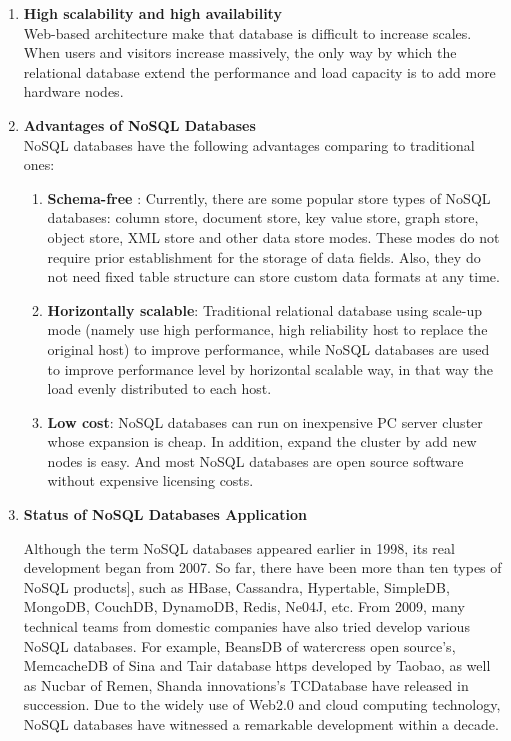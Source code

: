 \documentclass[12pt, a4paper]{article}
\begin{document}
\begin{enumerate}[leftmargin=2.5cm]

\item \textbf{   High scalability and high availability}\\Web-based architecture make that database is difficult to increase scales. When users and visitors increase massively, the only way by which the relational database extend the performance and load capacity is to add more hardware nodes.
\\
\item \textbf{Advantages of NoSQL Databases}\\NoSQL databases have the following advantages comparing to traditional ones:\\
\begin{enumerate}[leftmargin=0.5cm]
\item \textbf{Schema-free} : Currently,  there are some popular store  types  of NoSQL  databases:  column  store,  document  store, key value store,  graph store,  object store,  XML store and other data    store    modes.    These    modes    do    not    require    prior establishment  for  the  storage  of  data  fields.  Also,  they  do  not need fixed table structure can store custom data formats at any time.
\item \textbf{Horizontally scalable}: Traditional relational database using scale-up mode (namely use high performance, high reliability host to replace the original host) to improve performance,  while NoSQL  databases  are  used  to  improve performance level by horizontal scalable way, in that way the load evenly distributed to each host.
\item \textbf{Low cost}: NoSQL databases can run on inexpensive PC server cluster whose expansion is cheap. In addition, expand the cluster by add new nodes is easy. And most NoSQL databases are open source software without expensive licensing costs.\\
\end{enumerate}
\item \textbf{Status of NoSQL Databases Application}
 
Although the term NoSQL databases appeared earlier in 1998, its real development began from 2007. So far, there have been more than ten types of NoSQL products], such as HBase, Cassandra, Hypertable, SimpleDB, MongoDB, CouchDB, DynamoDB, Redis, Ne04J, etc. From 2009, many technical teams from domestic companies have also tried develop various NoSQL databases. For example, BeansDB of watercress open source's, MemcacheDB of Sina and Tair database https developed by Taobao, as well as Nucbar of Remen, Shanda innovations's TCDatabase have released in succession. Due to the widely use of Web2.0 and cloud computing technology, NoSQL databases have witnessed a remarkable development within a decade.
\end{enumerate}
\end{document}
